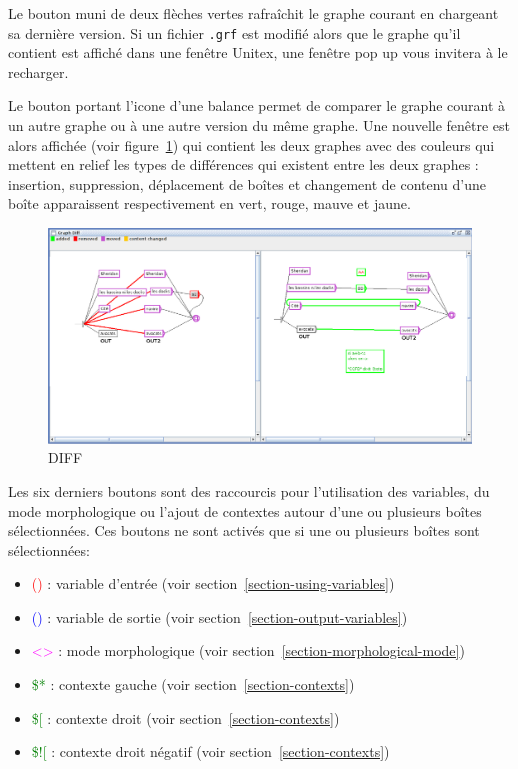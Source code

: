 Le bouton muni de deux flèches vertes rafraîchit le graphe courant en chargeant sa dernière version.
Si un fichier \verb+.grf+ est modifié alors que le graphe qu'il contient est affiché dans
une fenêtre Unitex, une fenêtre pop up vous invitera à le recharger.

\bigskip
\noindent Le bouton portant l'icone d'une balance permet de comparer le graphe courant à un autre
graphe ou à une autre version du même graphe. Une nouvelle fenêtre est alors affichée (voir
	figure~\ref{Graph-DIFF}) qui contient les deux graphes avec des couleurs qui mettent en
relief les types de différences qui existent entre les deux graphes : insertion, suppression,
déplacement de boîtes et changement de contenu d'une boîte apparaissent respectivement en vert,
rouge, mauve et jaune.

\bigskip
\noindent 
\begin{figure}[!h]
\begin{center}
\includegraphics[width=15.6cm]{resources/img/DIFF.png}
\caption{DIFF\label{Graph-DIFF}}
\end{center}
\end{figure}
\bigskip
\noindent

Les six derniers boutons sont des raccourcis pour l'utilisation des variables, du mode morphologique
ou l'ajout de contextes autour d'une ou plusieurs boîtes sélectionnées. Ces boutons ne sont activés que si une  ou plusieurs boîtes sont sélectionnées:
\begin{itemize}
\item \textcolor{red}{()}  : variable d'entrée	(voir section~\ref{section-using-variables})
\item \textcolor{blue}{()} : variable de sortie (voir section~\ref{section-output-variables})
\item \textcolor{magenta}{<>} : mode morphologique (voir section~\ref{section-morphological-mode})
\item \textcolor{green}{\$*} : contexte gauche (voir section~\ref{section-contexts})
\item \textcolor{green}{\$[} : contexte droit (voir section~\ref{section-contexts})
\item \textcolor{green}{\$![} : contexte droit négatif (voir section~\ref{section-contexts})
\end{itemize}

